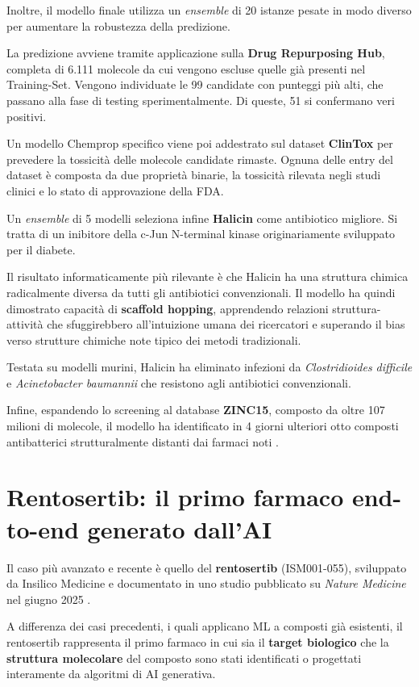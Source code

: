 Inoltre, il modello finale utilizza un \textit{ensemble} di 20 istanze pesate in modo diverso per aumentare la robustezza della predizione.

La predizione avviene tramite applicazione sulla \textbf{Drug Repurposing Hub}, completa di 6.111 molecole da cui vengono escluse quelle già presenti nel Training-Set.
Vengono individuate le 99 candidate con punteggi più alti, che passano alla fase di testing sperimentalmente. Di queste, 51 si confermano veri positivi.

Un modello Chemprop specifico viene poi addestrato sul dataset \textbf{ClinTox} per prevedere la tossicità delle molecole candidate rimaste.
Ognuna delle entry del dataset è composta da due proprietà binarie, la tossicità rilevata negli studi clinici e lo stato di approvazione della FDA.

Un \textit{ensemble} di 5 modelli seleziona infine \textbf{Halicin} come antibiotico migliore. Si tratta di un inibitore della c-Jun N-terminal kinase originariamente sviluppato per il diabete.

Il risultato informaticamente più rilevante è che 
Halicin ha una struttura chimica radicalmente diversa 
da tutti gli antibiotici convenzionali. Il modello ha quindi dimostrato capacità di \textbf{scaffold hopping},
apprendendo relazioni struttura-attività che sfuggirebbero
all'intuizione umana dei ricercatori e superando il bias
verso strutture chimiche note tipico dei metodi tradizionali.

Testata su modelli murini, 
Halicin ha eliminato infezioni da 
\textit{Clostridioides difficile} e 
\textit{Acinetobacter baumannii} che resistono 
agli antibiotici convenzionali.

Infine, espandendo lo 
screening al database \textbf{ZINC15}, composto da oltre 107 
milioni di molecole, il modello ha identificato in 4 giorni
ulteriori otto composti antibatterici strutturalmente 
distanti dai farmaci noti \cite{stokesDeepLearningApproach2020}.
\section{Rentosertib: il primo farmaco end-to-end 
generato dall'AI}
Il caso più avanzato e recente è quello del 
\textbf{rentosertib} (ISM001-055), sviluppato da 
Insilico Medicine e documentato in uno studio pubblicato su 
\textit{Nature Medicine} nel giugno 2025 
\cite{xuGenerativeAIDiscoveredTNIK2025}.

A differenza dei casi precedenti, i quali applicano ML 
a composti già esistenti, il rentosertib rappresenta 
il primo farmaco in cui sia il \textbf{target biologico} 
che la \textbf{struttura molecolare} del composto sono stati 
identificati o progettati interamente da algoritmi di 
AI generativa.


